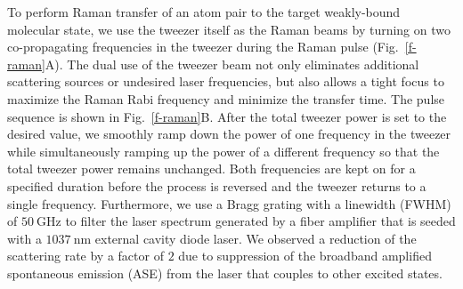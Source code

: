 \documentclass[aps,prl,twocolumn,superscriptaddress]{revtex4-1}
\begin{document}
To perform Raman transfer of an atom pair to the target weakly-bound molecular state, we use the tweezer itself as the Raman beams by turning on two co-propagating frequencies in the tweezer during the Raman pulse (Fig.~\ref{f-raman}A). The dual use of the tweezer beam not only eliminates additional scattering sources or undesired laser frequencies, but also allows a tight focus to maximize the Raman Rabi frequency and minimize the transfer time. %
The pulse sequence is shown in Fig.~\ref{f-raman}B. %
After the total tweezer power is set to the desired value, we smoothly ramp down the power of one frequency in the tweezer while simultaneously ramping up the power of a different frequency so that the total tweezer power remains unchanged. Both frequencies are kept on for a specified duration before the process is reversed and the tweezer returns to a single frequency.
Furthermore, we use a Bragg grating with a linewidth (FWHM) of $50 ~\mathrm{GHz}$ to filter the laser spectrum generated by a fiber amplifier that is seeded with a $1037~\mathrm{nm}$ external cavity diode laser. We observed a reduction of the scattering rate by a factor of $2$ due to suppression of the broadband amplified spontaneous emission (ASE) from the laser that couples to other excited states.

\end{document}
